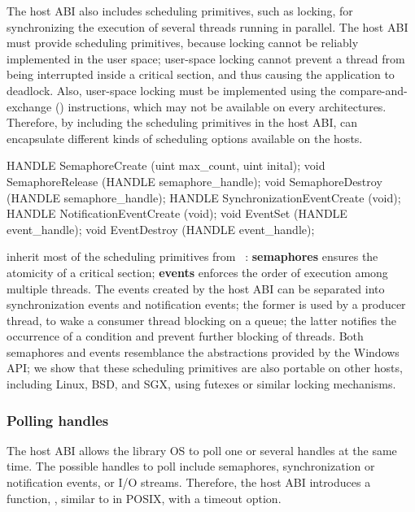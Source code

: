 The host ABI also includes scheduling primitives, such as locking, for synchronizing the execution
of several threads running in parallel.
The host ABI must provide scheduling primitives,
because locking cannot be reliably implemented in the user space;
user-space locking
cannot prevent a thread from being interrupted inside a critical section,
and thus 
causing the application to deadlock.
Also, user-space locking must be implemented using the compare-and-exchange () instructions, which may not be available on every architectures.
Therefore, by including the scheduling primitives in the host ABI,
\graphene{} can encapsulate different kinds of scheduling options available on the hosts.



\begin{paldef}
HANDLE SemaphoreCreate  (uint max_count, uint inital);
void   SemaphoreRelease (HANDLE semaphore_handle);
void   SemaphoreDestroy (HANDLE semaphore_handle);
HANDLE SynchronizationEventCreate (void);
HANDLE NotificationEventCreate    (void);
void EventSet     (HANDLE event_handle);
void EventDestroy (HANDLE event_handle);
\end{paldef}



\graphene{} inherit most of the scheduling primitives
from \drawbridge{}~\cite{porter11drawbridge}:
{\bf semaphores} ensures the atomicity of a critical section;
{\bf events} enforces the order of execution among multiple threads.
The events created by the host ABI
can be separated into synchronization events and notification events;
the former is used by a producer thread, to wake a consumer thread
blocking on a queue;
the latter notifies the occurrence of a condition
and prevent further blocking of threads.
Both semaphores and events resemblance the abstractions provided by the Windows API;
we show that these scheduling primitives are also portable on other hosts, including Linux, BSD, and SGX, using futexes or similar locking mechanisms.









\subsubsection*{Polling handles}


The host ABI allows the library OS to poll one or several handles
at the same time.
The possible handles to poll include semaphores, synchronization or notification events,
or I/O streams.
Therefore, the host ABI
introduces a function, , similar to  in POSIX,
with a timeout option.



